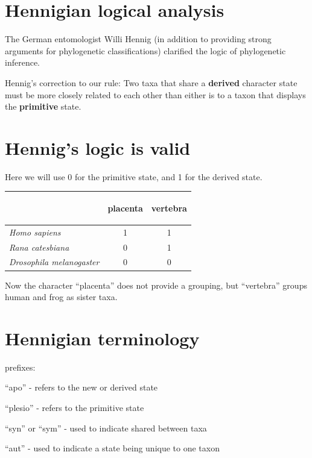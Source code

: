 \documentclass[landscape]{foils}
\begin{document}
\myNewSlide
\section*{Hennigian logical analysis}
The German entomologist Willi Hennig (in addition to 
providing strong arguments for phylogenetic classifications)
clarified the logic of phylogenetic inference.

Hennig's correction to our rule: Two taxa that share a 
{\bf derived} character state must be more closely
related to each other than either is to a taxon that 
displays the {\bf primitive} state.



\myNewSlide
\section*{Hennig's logic is valid}
Here we will use 0 for the primitive state, and 1 for the derived state.
\begin{table}[htdp]
\begin{center}
\begin{tabular}{l|c|c}
 & {\begin{sideways}\parbox{15mm}{placenta}\end{sideways}} & {\begin{sideways}\parbox{35mm}{vertebra}\end{sideways}}\\
\hline
{\em Homo sapiens} & 1 & 1 \\
{\em Rana catesbiana}  & 0 & 1 \\
{\em Drosophila melanogaster}  & 0 & 0 \\
\end{tabular}
\end{center}
\label{default}
\end{table}
Now the character ``placenta'' does not provide a grouping, but ``vertebra''
groups human and frog as sister taxa.

\myNewSlide
\section*{Hennigian terminology}
prefixes:
\begin{compactitem}
	\item ``apo'' - refers to the new or derived state
	\item ``plesio'' - refers to the primitive state
    \item ``syn'' or ``sym'' - used to indicate shared between taxa
    \item ``aut'' - used to indicate a state being unique to one taxon
\end{compactitem}
\end{document}
